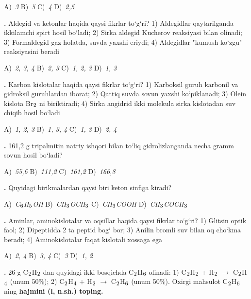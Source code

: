 \documentclass[11pt,a4paper]{article}
\renewcommand{\textsubscript}[1]{\ensuremath{_{\text{\fontsize{8}{8}\selectfont #1}}}}
\newcommand{\qn}[1]{\textbf{\fontsize{11.5}{13}\selectfont #1}}
\newcommand{\qsep}{\par\vspace{1pt}\noindent\rule{0pt}{0.4pt}\par\vspace{5pt}}
\begin{document}
\begin{multicols}{2}
\noindent A)~\textsl{3} \hfill B)~\textsl{5} \hfill C)~\textsl{4} \hfill D)~\textsl{2,5}\par
\qsep
\noindent\qn{24.} Aldegid va ketonlar haqida qaysi fikrlar to`g`ri? 1) Aldegidlar qaytarilganda ikkilamchi spirt hosil bo`ladi; 2) Sirka aldegid Kucherov reaksiyasi bilan olinadi; 3) Formaldegid gaz holatda, suvda yaxshi eriydi; 4) Aldegidlar "kumush ko`zgu" reaksiyasini beradi

\noindent A)~\textsl{2, 3, 4} \hfill B)~\textsl{2, 3} \hfill C)~\textsl{1, 2, 3} \hfill D)~\textsl{1, 3}\par
\qsep
\noindent\qn{25.} Karbon kislotalar haqida qaysi fikrlar to`g`ri? 1) Karboksil guruh karbonil va gidroksil guruhlardan iborat; 2) Qattiq suvda sovun yaxshi ko`piklanadi; 3) Olein kislota Br\textsubscript{2} ni biriktiradi; 4) Sirka angidrid ikki molekula sirka kislotadan suv chiqib hosil bo`ladi

\noindent A)~\textsl{1, 2, 3} \hfill B)~\textsl{1, 3, 4} \hfill C)~\textsl{1, 3} \hfill D)~\textsl{2, 4}\par
\qsep
\noindent\qn{26.} 161,2 g tripalmitin natriy ishqori bilan to`liq gidrolizlanganda necha gramm sovun hosil bo`ladi?

\noindent A)~\textsl{55,6} \hfill B)~\textsl{111,2} \hfill C)~\textsl{161,2} \hfill D)~\textsl{166,8}\par
\qsep
\noindent\qn{27.} Quyidagi birikmalardan qaysi biri keton sinfiga kiradi?

\noindent A)~\textsl{C\textsubscript{6}H\textsubscript{5}OH} \hfill B)~\textsl{CH\textsubscript{3}OCH\textsubscript{3}} \hfill C)~\textsl{CH\textsubscript{3}COOH} \hfill D)~\textsl{CH\textsubscript{3}COCH\textsubscript{3}}\par
\qsep
\noindent\qn{28.} Aminlar, aminokislotalar va oqsillar haqida qaysi fikrlar to`g`ri? 1) Glitsin optik faol; 2) Dipeptidda 2 ta peptid bog` bor; 3) Anilin bromli suv bilan oq cho`kma beradi; 4) Aminokislotalar faqat kislotali xossaga ega

\noindent A)~\textsl{2, 4} \hfill B)~\textsl{3, 4} \hfill C)~\textsl{3} \hfill D)~\textsl{1, 2}\par
\qsep
\noindent\qn{29.} 26 g C\textsubscript{2}H\textsubscript{2} dan quyidagi ikki bosqichda C\textsubscript{2}H\textsubscript{6} olinadi: 1) C\textsubscript{2}H\textsubscript{2} + H\textsubscript{2} $\to$ C\textsubscript{2}H\textsubscript{4} (unum 50\%); 2) C\textsubscript{2}H\textsubscript{4} + H\textsubscript{2} $\to$ C\textsubscript{2}H\textsubscript{6} (unum 50\%). Oxirgi mahsulot C\textsubscript{2}H\textsubscript{6} ning \textbf{hajmini (l, n.sh.) toping.}


\end{multicols}
\end{document}
